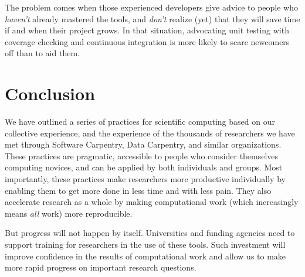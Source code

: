 \documentclass[10pt,letterpaper]{article}
\begin{document}
The problem comes when those experienced developers give advice to
people who \emph{haven't} already mastered the tools, and
\emph{don't} realize (yet) that they will save time if and when their
project grows.  In that situation, advocating unit testing with
coverage checking and continuous integration is more likely to scare
newcomers off than to aid them.

\section*{Conclusion}

We have outlined a series of practices for scientific computing based
on our collective experience, and the experience of the thousands of
researchers we have met through Software Carpentry, Data Carpentry,
and similar organizations.  These practices are pragmatic, accessible
to people who consider themselves computing novices, and can be applied
by both individuals and groups.
Most importantly, these practices make researchers more productive
individually by enabling them to get more done in less time and with
less pain.  They also accelerate research as a whole by making
computational work (which increasingly means \emph{all} work) more
reproducible.

But progress will not happen by itself.  Universities and funding
agencies need to support training for researchers in the use of these
tools.  Such investment will improve confidence in the results of
computational work and allow us to make more rapid progress on
important research questions.
\end{document}
